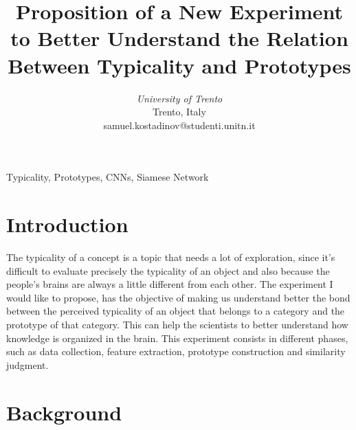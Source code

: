 \documentclass[conference]{IEEEtran}
\begin{document}
	\title{Proposition of a New Experiment to Better Understand the Relation Between Typicality and Prototypes}


	\author{
	\textit{University of Trento}\\
	Trento, Italy \\
	samuel.kostadinov@studenti.unitn.it}


	\maketitle


	\begin{abstract}
		
		\lipsum[1]
		
	\end{abstract}

	\begin{IEEEkeywords}
		Typicality, Prototypes, CNNs, Siamese Network
	\end{IEEEkeywords}


	\section{Introduction}
		
		The typicality of a concept is a topic that needs a lot of exploration, since it's difficult to evaluate precisely the typicality of an object 
		and also because the people's brains are always a little different from each other. The experiment I would like to propose, has the objective of 
		making us understand better the bond between the perceived typicality of an object that belongs to a category and the prototype of that category.
		This can help the scientists to better understand how knowledge is organized in the brain. This experiment consists in different phases, such as
		data collection, feature extraction, prototype construction and similarity judgment.


	\section{Background}
\end{document}

